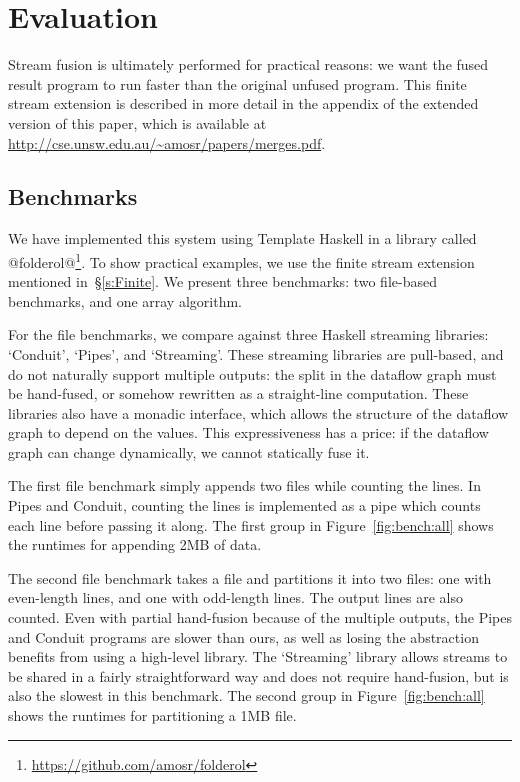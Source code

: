 \chapter{Evaluation}
\label{s:Benchmarks}
Stream fusion is ultimately performed for practical reasons: we want the fused result program to run faster than the original unfused program.
This finite stream extension is described in more detail in the appendix of the extended version of this paper, which is available at \url{http://cse.unsw.edu.au/~amosr/papers/merges.pdf}.


\section{Benchmarks}
We have implemented this system using Template Haskell in a library called @folderol@\footnote{\url{https://github.com/amosr/folderol}}.
To show practical examples, we use the finite stream extension mentioned in~\S\ref{s:Finite}.
We present three benchmarks: two file-based benchmarks, and one array algorithm.

For the file benchmarks, we compare against three Haskell streaming libraries: `Conduit', `Pipes', and `Streaming'.
These streaming libraries are pull-based, and do not naturally support multiple outputs: the split in the dataflow graph must be hand-fused, or somehow rewritten as a straight-line computation.
These libraries also have a monadic interface, which allows the structure of the dataflow graph to depend on the values. This expressiveness has a price: if the dataflow graph can change dynamically, we cannot statically fuse it.

The first file benchmark simply appends two files while counting the lines.
In Pipes and Conduit, counting the lines is implemented as a pipe which counts each line before passing it along.
The first group in Figure~\ref{fig:bench:all} shows the runtimes for appending 2MB of data.

The second file benchmark takes a file and partitions it into two files: one with even-length lines, and one with odd-length lines.
The output lines are also counted.
Even with partial hand-fusion because of the multiple outputs, the Pipes and Conduit programs are slower than ours, as well as losing the abstraction benefits from using a high-level library.
The `Streaming' library allows streams to be shared in a fairly straightforward way and does not require hand-fusion, but is also the slowest in this benchmark.
The second group in Figure~\ref{fig:bench:all} shows the runtimes for partitioning a 1MB file.


